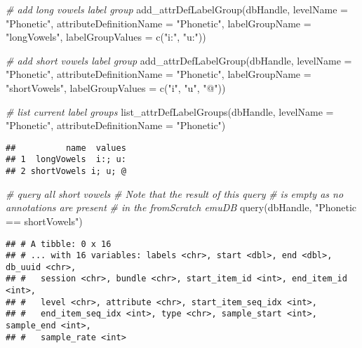 \documentclass[
]{book}
\newenvironment{Shaded}{\begin{snugshade}}{\end{snugshade}}
\newcommand{\AttributeTok}[1]{\textcolor[rgb]{0.77,0.63,0.00}{#1}}
\newcommand{\CommentTok}[1]{\textcolor[rgb]{0.56,0.35,0.01}{\textit{#1}}}
\newcommand{\FunctionTok}[1]{\textcolor[rgb]{0.00,0.00,0.00}{#1}}
\newcommand{\NormalTok}[1]{#1}
\newcommand{\StringTok}[1]{\textcolor[rgb]{0.31,0.60,0.02}{#1}}
\begin{document}
\begin{Shaded}
\begin{Highlighting}[]
\CommentTok{\# add long vowels label group}
\FunctionTok{add\_attrDefLabelGroup}\NormalTok{(dbHandle,}
                      \AttributeTok{levelName =} \StringTok{"Phonetic"}\NormalTok{,}
                      \AttributeTok{attributeDefinitionName =} \StringTok{"Phonetic"}\NormalTok{,}
                      \AttributeTok{labelGroupName =} \StringTok{"longVowels"}\NormalTok{,}
                      \AttributeTok{labelGroupValues =} \FunctionTok{c}\NormalTok{(}\StringTok{"i:"}\NormalTok{, }\StringTok{"u:"}\NormalTok{))}

\CommentTok{\# add short vowels label group}
\FunctionTok{add\_attrDefLabelGroup}\NormalTok{(dbHandle,}
                      \AttributeTok{levelName =} \StringTok{"Phonetic"}\NormalTok{,}
                      \AttributeTok{attributeDefinitionName =} \StringTok{"Phonetic"}\NormalTok{,}
                      \AttributeTok{labelGroupName =} \StringTok{"shortVowels"}\NormalTok{,}
                      \AttributeTok{labelGroupValues =} \FunctionTok{c}\NormalTok{(}\StringTok{"i"}\NormalTok{, }\StringTok{"u"}\NormalTok{, }\StringTok{"@"}\NormalTok{))}


\CommentTok{\# list current label groups}
\FunctionTok{list\_attrDefLabelGroups}\NormalTok{(dbHandle,}
                        \AttributeTok{levelName =} \StringTok{"Phonetic"}\NormalTok{,}
                        \AttributeTok{attributeDefinitionName =} \StringTok{"Phonetic"}\NormalTok{)}
\end{Highlighting}
\end{Shaded}

\begin{verbatim}
##          name  values
## 1  longVowels  i:; u:
## 2 shortVowels i; u; @
\end{verbatim}

\begin{Shaded}
\begin{Highlighting}[]
\CommentTok{\# query all short vowels}
\CommentTok{\# Note that the result of this query}
\CommentTok{\# is empty as no annotations are present}
\CommentTok{\# in the \textquotesingle{}fromScratch\textquotesingle{} emuDB}
\FunctionTok{query}\NormalTok{(dbHandle, }\StringTok{"Phonetic == shortVowels"}\NormalTok{)}
\end{Highlighting}
\end{Shaded}

\begin{verbatim}
## # A tibble: 0 x 16
## # ... with 16 variables: labels <chr>, start <dbl>, end <dbl>, db_uuid <chr>,
## #   session <chr>, bundle <chr>, start_item_id <int>, end_item_id <int>,
## #   level <chr>, attribute <chr>, start_item_seq_idx <int>,
## #   end_item_seq_idx <int>, type <chr>, sample_start <int>, sample_end <int>,
## #   sample_rate <int>
\end{verbatim}
\end{document}
